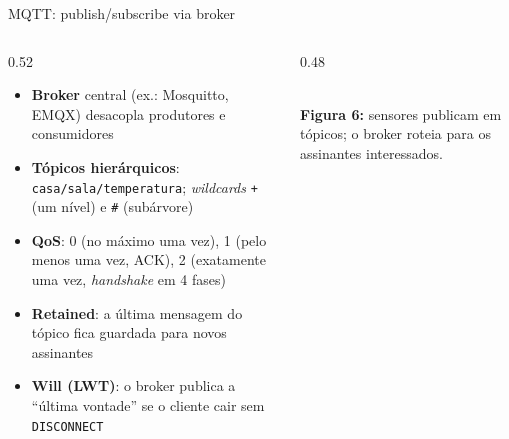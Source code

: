 \documentclass[aspectratio=169,11pt]{beamer}
\begin{document}
\begin{frame}{MQTT: publish/subscribe via broker}
  \begin{columns}
    \begin{column}{0.52\textwidth}
      \begin{itemize}
        \item \textbf{Broker} central (ex.: Mosquitto, EMQX) desacopla produtores e consumidores
        \item \textbf{Tópicos hierárquicos}: \texttt{casa/sala/temperatura}; \emph{wildcards} \texttt{+} (um nível) e \texttt{\#} (subárvore)
        \item \textbf{QoS}: 0 (no máximo uma vez), 1 (pelo menos uma vez, ACK), 2 (exatamente uma vez, \emph{handshake} em 4 fases)
        \item \textbf{Retained}: a última mensagem do tópico fica guardada para novos assinantes
        \item \textbf{Will (LWT)}: o broker publica a ``última vontade'' se o cliente cair sem \texttt{DISCONNECT}
      \end{itemize}
    \end{column}
    \begin{column}{0.48\textwidth}
      \begin{center}
        \\[1mm]
        {\scriptsize \textbf{Figura 6:} sensores publicam em tópicos; o broker roteia para os assinantes interessados.}
      \end{center}
    \end{column}
  \end{columns}
\end{frame}
\end{document}
